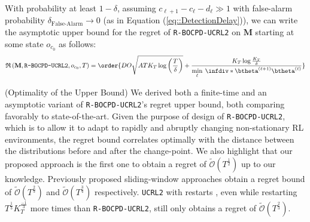 \documentclass{article} %
\begin{document}
\begin{corollary}
With probability at least $1- \delta$, assuming $c_{\ell+1}-c_\ell-d_\ell \gg 1$ with false-alarm probability $\delta_{\text{False-Alarm}} \to 0$ (as in Equation (\ref{eq::DetectionDelay})), we can write the asymptotic upper bound for the regret of \texttt{R-BOCPD-UCRL2} on $\mathbf{M}$ starting at some state $o_{c_0}$ as follows:
\begin{align*}
    \mathfrak{R} \left(\mathbf{M}, \texttt{R-BOCPD-UCRL2}, o_{c_0}, T\right) = \order{D O \sqrt{A T K_T \log\left (\frac{T}{\delta} \right)} + \frac{K_T \log \frac{K_T}{\delta}}{\min\limits_\ell \: \infdiv*{\btheta^{(\ell+1)}}{\btheta^{(\ell)}}}}
\end{align*}
\label{main_cor} 
\end{corollary}
\begin{discussion}{(Optimality of the Upper Bound)}
We derived both a finite-time and an asymptotic variant of \texttt{R-BOCPD-UCRL2}'s regret upper bound, both comparing favorably to state-of-the-art. Given the purpose of design of \texttt{R-BOCPD-UCRL2}, which is to allow it to adapt to rapidly and abruptly changing non-stationary RL environments, the regret bound correlates optimally with the distance between the distributions before and after the change-point. We also highlight that our proposed approach is the first one to obtain a regret of $\tilde{\mathcal{O}}(T^{\frac{1}{2}})$ up to our knowledge. Previously proposed sliding-window approaches \cite{SWUCRL, SWUCRL2CW}  obtain a regret bound of $\tilde{\mathcal{O}}(T^{\frac{2}{3}})$ and $\tilde{\mathcal{O}}(T^{\frac{3}{4}})$ respectively. \texttt{UCRL2} with restarts \cite{UCRL2}, even while restarting $T^{\frac{1}{3}}K_T^{\frac{-1}{3}}$ more times than \texttt{R-BOCPD-UCRL2}, still only obtains a regret of $\tilde{\mathcal{O}}(T^{\frac{2}{3}})$.
\end{discussion}

\vspace{-1.4em}
\end{document}
